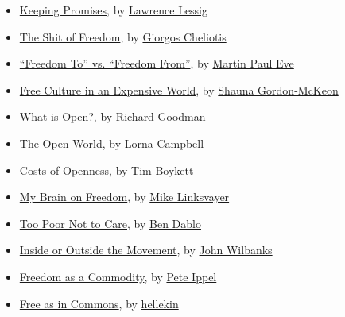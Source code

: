 \begin{itemize}
\tightlist
\item
  \href{keeping-promises.html}{Keeping Promises}, by
  \href{../appendix/attributions.html\#lawrence-lessig}{Lawrence Lessig}
\item
  \href{the-shit-of-freedom.html}{The Shit of Freedom}, by
  \href{../appendix/attributions.html\#giorgos-cheliotis}{Giorgos
  Cheliotis}
\item
  \href{freedom-to-vs-freedom-from.html}{``Freedom To'' vs. ``Freedom
  From''}, by
  \href{../appendix/attributions.html\#martin-paul-eve}{Martin Paul Eve}
\item
  \href{free-culture-in-an-expensive-world.html}{Free Culture in an
  Expensive World}, by
  \href{../appendix/attributions.html\#shauna-gordon-mckeon}{Shauna
  Gordon-McKeon}
\item
  \href{what-is-open.html}{What is Open?}, by
  \href{../appendix/attributions.html\#richard-goodman}{Richard Goodman}
\item
  \href{the-open-world.html}{The Open World}, by
  \href{../appendix/attributions.html\#lorna-campbell}{Lorna Campbell}
\item
  \href{costs-of-openness.html}{Costs of Openness}, by
  \href{../appendix/attributions.html\#tim-boykett}{Tim Boykett}
\item
  \href{my-brain-on-freedom.html}{My Brain on Freedom}, by
  \href{../appendix/attributions.html\#mike-linksvayer}{Mike Linksvayer}
\item
  \href{too-poor-not-to-care.html}{Too Poor Not to Care}, by
  \href{../appendix/attributions.html\#ben-dablo}{Ben Dablo}
\item
  \href{inside-or-outside-the-movement.html}{Inside or Outside the
  Movement}, by \href{../appendix/attributions.html\#john-wilbanks}{John
  Wilbanks}
\item
  \href{freedom-as-a-commodity.html}{Freedom as a Commodity}, by
  \href{../appendix/attributions.html\#pete-ippel}{Pete Ippel}
\item
  \href{free-as-in-commons.html}{Free as in Commons}, by
  \href{../appendix/attributions.html\#hellekin}{hellekin}
\end{itemize}
